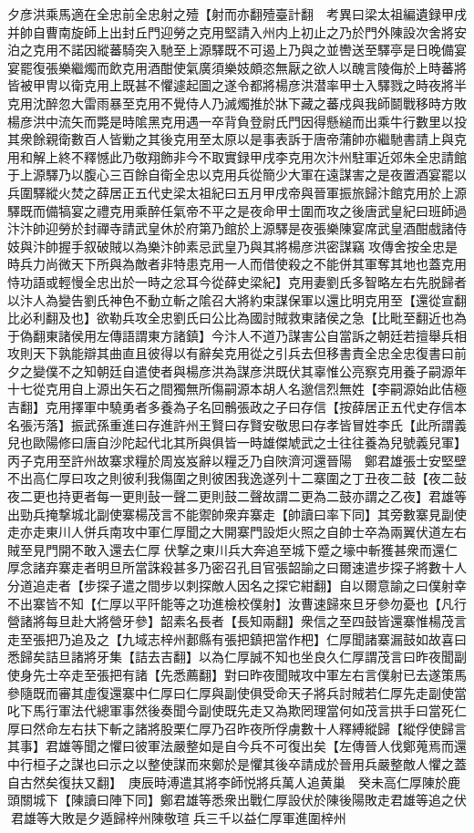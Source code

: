 夕彦洪乘馬適在全忠前全忠射之殪【射而亦翻殪臺計翻　考異曰梁太祖編遺録甲戌并帥自曹南旋師上出封丘門迎勞之克用堅請入州内上初止之乃於門外陳設次舍將安泊之克用不諾因縱蕃騎突入馳至上源驛既不可遏上乃與之並轡送至驛亭是日晚備宴宴罷復張樂繼燭而飲克用酒酣使氣廣須樂妓頗恣無厭之欲人以醜言陵侮於上時蕃將皆被甲冑以衛克用上既甚不懼遽起圖之遂令都將楊彦洪潜率甲士入驛戮之時夜將半克用沈醉忽大雷雨暴至克用不覺侍人乃滅燭推於牀下藏之蕃戍與我師鬬戰移時方敗楊彦洪中流矢而斃是時隂黑克用遇一卒背負登尉氏門因得懸縋而出乘牛行數里以投其衆餘親衛數百人皆勦之其後克用至太原以是事表訴于唐帝蒲帥亦繼馳書請上與克用和解上終不釋憾此乃敬翔飾非今不取實録甲戌李克用次汴州駐軍近郊朱全忠請館于上源驛乃以腹心三百餘自衛全忠以克用兵從簡少大軍在遠謀害之是夜置酒宴罷以兵圍驛縱火焚之薛居正五代史梁太祖紀曰五月甲戌帝與晉軍振旅歸汴館克用於上源驛既而備犒宴之禮克用乘醉任氣帝不平之是夜命甲士圍而攻之後唐武皇紀曰班師過汴汴帥迎勞於封禪寺請武皇休於府第乃館於上源驛是夜張樂陳宴席武皇酒酣戲諸侍妓與汴帥握手叙破賊以為樂汴帥素忌武皇乃與其將楊彦洪密謀竊攻傳舍按全忠是時兵力尚微天下所與為敵者非特患克用一人而借使殺之不能併其軍奪其地也蓋克用恃功語或輕慢全忠出於一時之忿耳今從薛史梁紀】克用妻劉氏多智略左右先脱歸者以汴人為變告劉氏神色不動立斬之隂召大將約束謀保軍以還比明克用至【還從宣翻比必利翻及也】欲勒兵攻全忠劉氏曰公比為國討賊救東諸侯之急【比毗至翻近也為于偽翻東諸侯用左傳語謂東方諸鎮】今汴人不道乃謀害公自當訴之朝廷若擅舉兵相攻則天下孰能辯其曲直且彼得以有辭矣克用從之引兵去但移書責全忠全忠復書曰前夕之變僕不之知朝廷自遣使者與楊彦洪為謀彦洪既伏其辜惟公亮察克用養子嗣源年十七從克用自上源出矢石之間獨無所傷嗣源本胡人名邈信烈無姓【李嗣源始此佶極吉翻】克用擇軍中驍勇者多養為子名回鶻張政之子曰存信【按薛居正五代史存信本名張汚落】振武孫重進曰存進許州王賢曰存賢安敬思曰存孝皆冒姓李氏【此所謂義兒也歐陽修曰唐自沙陀起代北其所與俱皆一時雄傑虓武之士往往養為兒號義兒軍】丙子克用至許州故寨求糧於周岌岌辭以糧乏乃自陜濟河還晉陽　鄭君雄張士安堅壁不出高仁厚曰攻之則彼利我傷圍之則彼困我逸遂列十二寨圍之丁丑夜二鼓【夜二鼔夜二更也持更者每一更則鼔一聲二更則鼓二聲故謂二更為二鼓亦謂之乙夜】君雄等出勁兵掩撃城北副使寨楊茂言不能禦帥衆弃寨走【帥讀曰率下同】其旁數寨見副使走亦走東川人併兵南攻中軍仁厚聞之大開寨門設炬火照之自帥士卒為兩翼伏道左右賊至見門開不敢入還去仁厚伏撃之東川兵大奔追至城下蹙之壕中斬獲甚衆而還仁厚念諸弃寨走者明旦所當誅殺甚多乃密召孔目官張韶諭之曰爾速遣步探子將數十人分道追走者【步探子遣之間步以刺探敵人因名之探它紺翻】自以爾意諭之曰僕射幸不出寨皆不知【仁厚以平阡能等之功進檢校僕射】汝曹速歸來旦牙參勿憂也【凡行營諸將每旦赴大將營牙參】韶素名長者【長知兩翻】衆信之至四鼓皆還寨惟楊茂言走至張把乃追及之【九域志梓州郪縣有張把鎮把當作杷】仁厚聞諸寨漏鼓如故喜曰悉歸矣詰旦諸將牙集【詰去吉翻】以為仁厚誠不知也坐良久仁厚謂茂言曰昨夜聞副使身先士卒走至張把有諸【先悉薦翻】對曰昨夜聞賊攻中軍左右言僕射已去遂策馬參隨既而審其虛復還寨中仁厚曰仁厚與副使俱受命天子將兵討賊若仁厚先走副使當叱下馬行軍法代總軍事然後奏聞今副使既先走又為欺罔理當何如茂言拱手曰當死仁厚曰然命左右扶下斬之諸將股栗仁厚乃召昨夜所俘虜數十人釋縛縱歸【縱俘使歸言其事】君雄等聞之懼曰彼軍法嚴整如是自今兵不可復出矣【左傳晉人伐鄭蒐焉而還中行桓子之謀也曰示之以整使謀而來鄭於是懼其後卒請成於晉用兵嚴整敵人懼之蓋自古然矣復扶又翻】　庚辰時溥遣其將李師悦將兵萬人追黄巢　癸未高仁厚陳於鹿頭關城下【陳讀曰陣下同】鄭君雄等悉衆出戰仁厚設伏於陳後陽敗走君雄等追之伏君雄等大敗是夕遁歸梓州陳敬瑄兵三千以益仁厚軍進圍梓州

